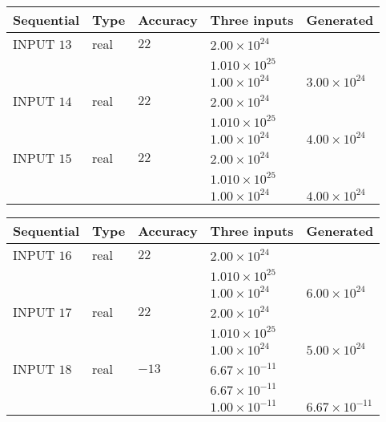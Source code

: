 \documentclass[12pt]{article}
\begin{document}
   
  
  
\noindent\begin{tabular}{|l|l|l|l|l|}
\hline
 Sequential & Type & Accuracy & Three inputs & Generated \\ 
\hline
 
 
  INPUT $           13 $ & real & $           22  $ & $
 2.00 \times 10^{24}
  $ & \\
  & & &  $
 1.010 \times 10^{25}
  $ & \\
  & & &  $
 1.00 \times 10^{24}
 $ & $ 3.00 \times 10^{24} $ 
 \\  \hline  
 
 
  INPUT $           14 $ & real & $           22  $ & $
 2.00 \times 10^{24}
  $ & \\
  & & &  $
 1.010 \times 10^{25}
  $ & \\
  & & &  $
 1.00 \times 10^{24}
 $ & $ 4.00 \times 10^{24} $ 
 \\  \hline  
 
 
  INPUT $           15 $ & real & $           22  $ & $
 2.00 \times 10^{24}
  $ & \\
  & & &  $
 1.010 \times 10^{25}
  $ & \\
  & & &  $
 1.00 \times 10^{24}
 $ & $ 4.00 \times 10^{24} $ 
 \\  \hline  
 \end{tabular}
   
   
  
  
\noindent\begin{tabular}{|l|l|l|l|l|}
\hline
 Sequential & Type & Accuracy & Three inputs & Generated \\ 
\hline
 
 
  INPUT $           16 $ & real & $           22  $ & $
 2.00 \times 10^{24}
  $ & \\
  & & &  $
 1.010 \times 10^{25}
  $ & \\
  & & &  $
 1.00 \times 10^{24}
 $ & $ 6.00 \times 10^{24} $ 
 \\  \hline  
 
 
  INPUT $           17 $ & real & $           22  $ & $
 2.00 \times 10^{24}
  $ & \\
  & & &  $
 1.010 \times 10^{25}
  $ & \\
  & & &  $
 1.00 \times 10^{24}
 $ & $ 5.00 \times 10^{24} $ 
 \\  \hline  
 
 
  INPUT $           18 $ & real & $          -13  $ & $
 6.67 \times 10^{-11}
  $ & \\
  & & &  $
 6.67 \times 10^{-11}
  $ & \\
  & & &  $
 1.00 \times 10^{-11}
 $ & $ 6.67 \times 10^{-11} $ 
 \\  \hline  
 \end{tabular}
   
\end{document}
